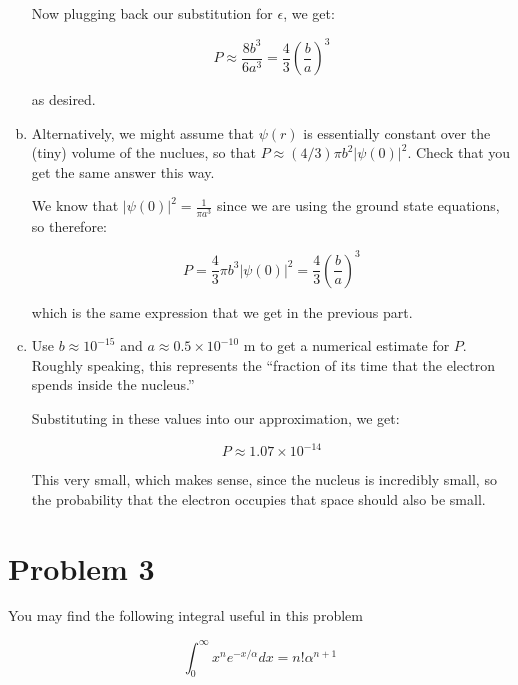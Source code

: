 \documentclass[10pt]{article}
\begin{document}
\begin{enumerate}[(a)]
\begin{solution}
            Now plugging back our substitution for $\epsilon$, we get: 

            \[ P \approx \frac{8b^3}{6a^3} = \frac{4}{3} \left(\frac{b}{a}\right)^3\] 

            as desired.
        \end{solution}
    
        \item Alternatively, we might assume that $\psi(r)$ is essentially constant over the (tiny) volume of the nuclues, so that $P \approx (4/3)\pi b^2 |\psi(0)|^2$. Check that you get the same answer this way.
        
        \begin{solution}
            We know that $|\psi(0)|^2 = \frac{1}{\pi a^3}$ since we are using the ground state equations, so therefore: 

            \[ P = \frac{4}{3} \pi b^3 |\psi(0)|^2 = \frac{4}{3} \left( \frac ba\right)^3\]

            which is the same expression that we get in the previous part. 
        \end{solution}
        \item Use $b \approx 10^{-15}$ and $a \approx 0.5 \times 10^{-10}$ m to get a numerical estimate for $P$. Roughly speaking, this represents the ``fraction of its time that the electron spends inside the nucleus.''
        
        \begin{solution}
            Substituting in these values into our approximation, we get: 

            \[ P \approx 1.07 \times 10^{-14}\] 

            This very small, which makes sense, since the nucleus is incredibly small, so the probability that the electron occupies that space should also be small. 
        \end{solution}
    \end{enumerate}


    \pagebreak

    \section*{Problem 3}

    You may find the following integral useful in this problem 

    \[ \int_0^\infty x^n e^{-x/\alpha} dx = n! \alpha^{n+1}\] 
\end{document}
